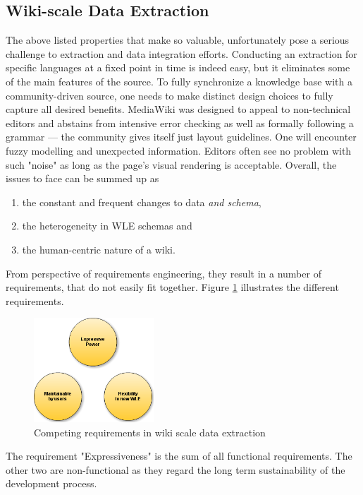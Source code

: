 \subsection{Wiki-scale Data Extraction}
The above listed properties that make \wik so valuable, unfortunately pose a serious challenge to extraction and data integration efforts. 
Conducting an extraction for specific languages at a fixed point in time is indeed easy, but it eliminates some of the main features of the source. 
To fully synchronize a knowledge base with a community-driven source, one needs to make distinct design choices to fully capture all desired benefits.
MediaWiki was designed to appeal to non-technical editors and abstains from intensive error checking as well as formally following a grammar --- the community gives itself just layout guidelines. 
One will encounter fuzzy modelling and unexpected information. 
Editors often see no problem with such "noise" as long as the page's visual rendering is acceptable.  
Overall, the issues to face can be summed up as 
\begin{enumerate}
\item the constant and frequent changes to data \textit{and schema},
\item the heterogeneity in WLE schemas and
\item the human-centric nature of a wiki.
\end{enumerate}  
From perspective of requirements engineering, they result in a number of requirements, that do not easily fit together. Figure \ref{fig:requirements} illustrates the different requirements.
\begin{figure}[tb]
\centering
\includegraphics[width=0.4\textwidth]{../images/requirements}
\caption{Competing requirements in wiki scale data extraction}
\label{fig:requirements}
\end{figure}
The requirement "Expressiveness" is the sum of all functional requirements. The other two are non-functional as they regard the long term sustainability of the development process.
